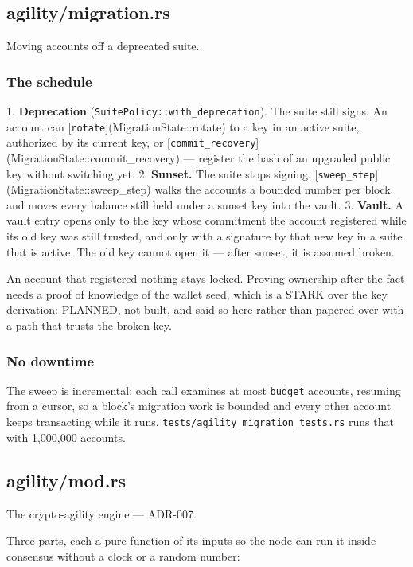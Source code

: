 \documentclass[11pt,a4paper]{article}
\begin{document}
\subsection{agility/migration.rs}
Moving accounts off a deprecated suite.

\subsubsection{The schedule}

1. \textbf{Deprecation} (\texttt{SuitePolicy::with\_deprecation}). The suite still
   signs. An account can [\texttt{rotate}](MigrationState::rotate) to a key in an
   active suite, authorized by its current key, or
   [\texttt{commit\_recovery}](MigrationState::commit\_recovery) — register the hash
   of an upgraded public key without switching yet.
2. \textbf{Sunset.} The suite stops signing. [\texttt{sweep\_step}](MigrationState::sweep\_step)
   walks the accounts a bounded number per block and moves every balance
   still held under a sunset key into the vault.
3. \textbf{Vault.} A vault entry opens only to the key whose commitment the
   account registered while its old key was still trusted, and only with a
   signature by that new key in a suite that is active. The old key cannot
   open it — after sunset, it is assumed broken.

An account that registered nothing stays locked. Proving ownership after
the fact needs a proof of knowledge of the wallet seed, which is a STARK
over the key derivation: PLANNED, not built, and said so here rather than
papered over with a path that trusts the broken key.

\subsubsection{No downtime}

The sweep is incremental: each call examines at most \texttt{budget} accounts,
resuming from a cursor, so a block's migration work is bounded and every
other account keeps transacting while it runs. \texttt{tests/agility\_migration\_tests.rs}
runs that with 1,000,000 accounts.

\subsection{agility/mod.rs}
The crypto-agility engine — ADR-007.

Three parts, each a pure function of its inputs so the node can run it
inside consensus without a clock or a random number:
\end{document}

